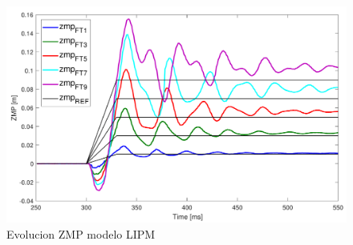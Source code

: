 \begin{figure}[H]
\centering
\includegraphics[scale=0.6]{imagenes/apartado_5/5.1/figura3.pdf}
\caption{Evolucion ZMP modelo LIPM}
\label{figura54}
\end{figure}

